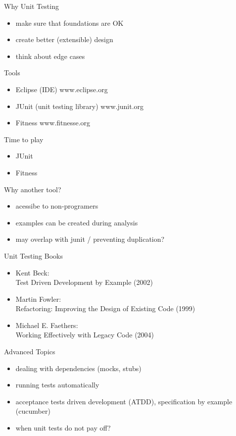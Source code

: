 \documentclass[14pt, t]{beamer}
\begin{document}
\begin{frame}{Why Unit Testing}
	\begin{itemize}
		\item make sure that foundations are OK
		\item create better (extensible) design
		\item think about edge cases
	\end{itemize}
\end{frame}

\begin{frame}{Tools}
	\begin{itemize}
		\item Eclipse (IDE) www.eclipse.org
		\item JUnit (unit testing library) www.junit.org
\pause
		\item Fitness www.fitnesse.org
	\end{itemize}
\end{frame}

\begin{frame}{Time to play}
	\begin{itemize}
		\item JUnit
		\item Fitness
	\end{itemize}
\pause
Why another tool?
	\begin{itemize}
		\item acessibe to non-programers
		\item examples can be created during analysis
		\item may overlap with junit / preventing duplication?
	\end{itemize}

\end{frame}

\begin{frame}{Unit Testing Books}
	\begin{itemize}
		\item Kent Beck:\\ Test Driven Development by Example (2002)
		\item Martin Fowler:\\ Refactoring: Improving the Design of Existing Code (1999)
		\item Michael E. Faethers:\\ Working Effectively with Legacy Code (2004)
	\end{itemize}
\end{frame}

\begin{frame}{Advanced Topics}
	\begin{itemize}
		\item dealing with dependencies (mocks, stubs)
			\pause
		\item running tests automatically
		\pause
		\item acceptance tests driven development (ATDD), specification by example (cucumber)
		\pause
		\item when unit tests do not pay off?
	\end{itemize}
\end{frame}
\end{document}
